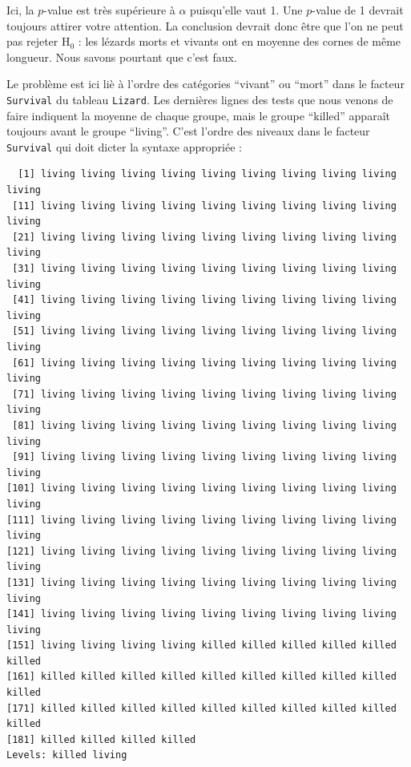 \documentclass[
  a4paper,
  DIV=11,
  numbers=noendperiod,
  oneside]{scrreprt}
\newenvironment{Shaded}{}{}
\newcommand{\NormalTok}[1]{\textcolor[rgb]{0.14,0.16,0.18}{#1}}
\newcommand{\SpecialCharTok}[1]{\textcolor[rgb]{0.00,0.36,0.77}{#1}}
\begin{document}
Ici, la \(p\)-value est très supérieure à \(\alpha\) puisqu'elle vaut 1.
Une \(p\)-value de 1 devrait toujours attirer votre attention. La
conclusion devrait donc être que l'on ne peut pas rejeter H\(_0\) : les
lézards morts et vivants ont en moyenne des cornes de même longueur.
Nous savons pourtant que c'est faux.

Le problème est ici liè à l'ordre des catégories ``vivant'' ou ``mort''
dans le facteur \texttt{Survival} du tableau \texttt{Lizard}. Les
dernières lignes des tests que nous venons de faire indiquent la moyenne
de chaque groupe, mais le groupe ``killed'' apparaît toujours avant le
groupe ``living''. C'est l'ordre des niveaux dans le facteur
\texttt{Survival} qui doit dicter la syntaxe appropriée :

\begin{Shaded}
\end{Shaded}

\begin{verbatim}
  [1] living living living living living living living living living living
 [11] living living living living living living living living living living
 [21] living living living living living living living living living living
 [31] living living living living living living living living living living
 [41] living living living living living living living living living living
 [51] living living living living living living living living living living
 [61] living living living living living living living living living living
 [71] living living living living living living living living living living
 [81] living living living living living living living living living living
 [91] living living living living living living living living living living
[101] living living living living living living living living living living
[111] living living living living living living living living living living
[121] living living living living living living living living living living
[131] living living living living living living living living living living
[141] living living living living living living living living living living
[151] living living living living killed killed killed killed killed killed
[161] killed killed killed killed killed killed killed killed killed killed
[171] killed killed killed killed killed killed killed killed killed killed
[181] killed killed killed killed
Levels: killed living
\end{verbatim}
\end{document}
